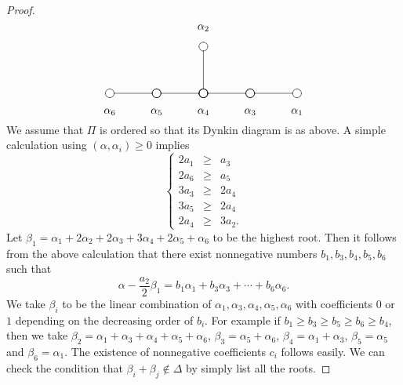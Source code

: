 \documentclass[12pt]{amsart}
\theoremstyle{definition}
\theoremstyle{remark}
\numberwithin{equation}{section}
\begin{document}
\begin{proof}
\[ 
\xy 
(30,0)*{\cir<4pt>{}}; (45,0)*{\cir<4pt>{}}; **\dir{-};
(45,0)*{\cir<4pt>{}}; (60,0)*{\cir<4pt>{}}; **\dir{-};
(60,0)*{\cir<4pt>{}}; (75,0)*{\cir<4pt>{}}; **\dir{-};
(75,0)*{\cir<4pt>{}}; (90,0)*{\cir<4pt>{}}; **\dir{-};
(60,0)*{\cir<4pt>{}}; (60,15)*{\cir<4pt>{}}; **\dir{-};
(30, -6)*{\alpha_6};
(45, -6)*{\alpha_5};
(60, -6)*{\alpha_4};
(75, -6)*{\alpha_3};
(90, -6)*{\alpha_1};
(60,21)*{\alpha_2};
\endxy 
\]
We assume that $\Pi$ is ordered so that its Dynkin diagram is as above. 
 A simple calculation using  $(\alpha, \alpha_i)\ge 0$ implies
\[\left\{
\begin{array}{rcl}
2a_1 &\ge  &a_3 \\
2a_6 & \ge & a_5  \\
3a_3 & \ge & 2a_4\\
3a_5 & \ge & 2a_4 \\
2a_4 & \ge & 3a_2.
\end{array}
\right.
\]
Let  $\beta_1 = \alpha_1+2\alpha_2+2\alpha_3+3\alpha_4+2\alpha_5+\alpha_6$ 
to be the highest root. 
Then it follows from the above calculation that
there exist nonnegative numbers $b_1, b_3, b_4, b_5, b_6$ such that 
\[
\alpha-\frac{a_2}{2}\beta_1=b_1\alpha_1+b_3\alpha_3+\cdots+b_6\alpha_6.
\]
We take $\beta_i$ to be the linear combination of $\alpha_1, \alpha_3, \alpha_4, \alpha_5, \alpha_6$ with coefficients 
$0$ or $1$ depending on the decreasing  order  of $b_i$. For example if 
$b_1\ge b_3\ge b_5 \ge b_6\ge b_4$,  then we take 
$\beta_2=\alpha_1+\alpha_3+\alpha_4+\alpha_5+\alpha_6$, $\beta_3=\alpha_5+\alpha_6$, $\beta_4=\alpha_1+\alpha_3$,
$\beta_5=\alpha_5$ and $\beta_6=\alpha_1$.
The existence of nonnegative coefficients $c_i$ follows easily. 
We can check the condition that $\beta_i+\beta_j\not \in \Delta$ by simply 
list all the roots. 
\end{proof}
\end{document}
